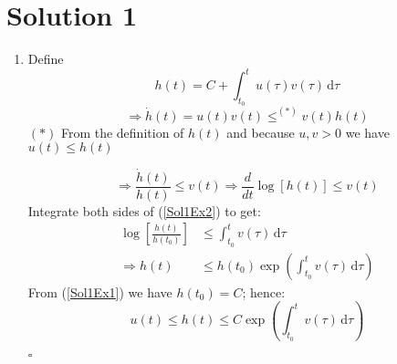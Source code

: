 \documentclass[twoside,10pt,a4paper]{article}
\begin{document}
\section*{Solution 1}
\begin{enumerate}[label=(\arabic*)]

\item Define
\begin{equation}\label{Sol1Ex1}
	h(t) = C + \int_{t_0}^t u(\tau)v(\tau)\,\text{d}\tau
\end{equation}
\begin{equation*}
	\Longrightarrow \dot{h}(t) = u(t)v(t) \leq^{(\ast)} v(t)h(t) 
\end{equation*}
$(\ast)$ From the definition of $h(t)$ and because $u,v>0$ we have $u(t) \leq h(t)$

\begin{equation}\label{Sol1Ex2}
\Longrightarrow \frac{\dot{h}(t)}{h(t)} \leq v(t) \Longrightarrow \frac{d}{dt} \log \left[ h(t) \right] \leq v(t)
\end{equation}
Integrate both sides of (\ref{Sol1Ex2}) to get:
\begin{align*}
	\log \left[ \frac{h(t)}{h(t_0)} \right] &\leq \int_{t_0}^t v(\tau)\,\text{d}\tau \\
	\Longrightarrow h(t) &\leq h(t_0) \exp\left( \int_{t_0}^t v(\tau)\,\text{d}\tau \right)
\end{align*}
From (\ref{Sol1Ex1}) we have $h(t_0)=C$; hence:
\begin{equation*}
	u(t) \leq h(t) \leq C \exp\left( \int_{t_0}^t v(\tau)\,\text{d}\tau \right)
\end{equation*}
\begin{flushright}
	$\square$
\end{flushright}



\end{enumerate}
\end{document}

